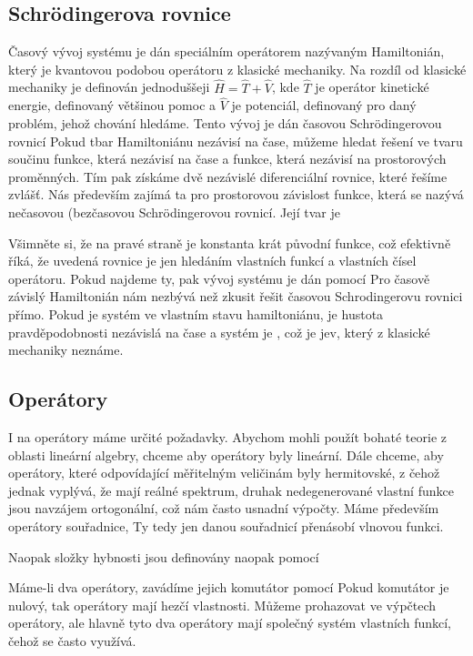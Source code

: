 \documentclass[fykos]{fksgeneric}
\begin{document}
\subsection{Schrödingerova rovnice}
Časový vývoj systému je dán speciálním operátorem nazývaným Hamiltonián, který je kvantovou podobou operátoru z klasické mechaniky. Na rozdíl od klasické mechaniky je definován jednoduššeji $\hat{H} = \hat{T} + \hat{V}$, kde $\hat{T}$ je operátor kinetické energie, definovaný většinou pomoc
a $\hat{V}$ je potenciál, definovaný pro daný problém, jehož chování hledáme.
Tento vývoj je dán časovou Schrödingerovou rovnicí
Pokud tbar Hamiltoniánu nezávisí na čase, můžeme hledat řešení ve tvaru součinu funkce, která nezávisí na čase a funkce, která nezávisí na prostorových proměnných. Tím pak získáme dvě nezávislé diferenciální rovnice, které řešíme zvlášť.
Nás především zajímá ta pro prostorovou závislost funkce, která se nazývá nečasovou (bezčasovou Schrödingerovou rovnicí. Její tvar je

Všimněte si, že na pravé straně je konstanta krát původní funkce, což efektivně říká, že uvedená rovnice je jen hledáním vlastních funkcí a vlastních čísel operátoru. Pokud najdeme ty, pak vývoj systému je dán pomocí
Pro časově závislý Hamiltonián nám nezbývá než zkusit řešit časovou Schrodingerovu rovnici přímo. Pokud je systém ve vlastním stavu hamiltoniánu, je hustota pravděpodobnosti nezávislá na čase a systém je , což je jev, který z klasické mechaniky neznáme.

\subsection{Operátory}
I na operátory máme určité požadavky. Abychom mohli použít bohaté teorie z oblasti lineární algebry, chceme aby operátory byly lineární. Dále chceme, aby operátory, které odpovídající měřitelným veličinám byly hermitovské, z čehož jednak vyplývá, že mají reálné spektrum, druhak nedegenerované vlastní funkce jsou navzájem ortogonální, což nám často usnadní výpočty.
Máme především operátory souřadnice,
Ty tedy jen danou souřadnicí přenásobí vlnovou funkci.

Naopak složky hybnosti jsou definovány naopak pomocí

Máme-li dva operátory, zavádíme jejich komutátor pomocí
Pokud komutátor je nulový, tak operátory mají hezčí vlastnosti. Můžeme prohazovat ve výpčtech operátory, ale hlavně tyto dva operátory mají společný systém vlastních funkcí,
čehož se často využívá.
\end{document}
